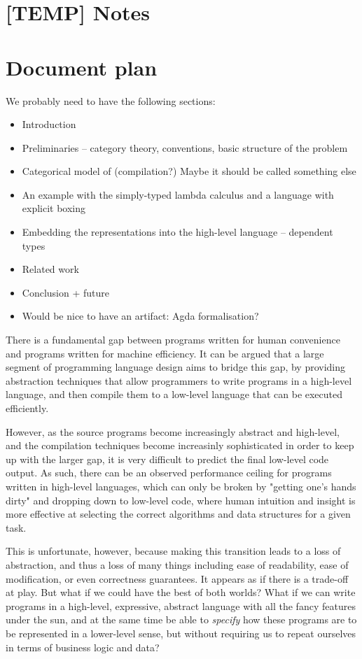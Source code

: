 \section{[TEMP] Notes}\label{sec:notes}

\section{Document plan}

We probably need to have the following sections:

\begin{itemize}
  \item Introduction
  \item Preliminaries -- category theory, conventions, basic structure of the problem
  \item Categorical model of (compilation?) Maybe it should be called something else
  \item An example with the simply-typed lambda calculus and a language with explicit
        boxing
  \item Embedding the representations into the high-level language -- dependent types
  \item Related work
  \item Conclusion + future
  \item Would be nice to have an artifact: Agda formalisation?
\end{itemize}

There is a fundamental gap between programs written for human convenience and
programs written for machine efficiency. It can be argued that a large segment
of programming language design aims to bridge this gap, by providing
abstraction techniques that allow programmers to write programs in a high-level
language, and then compile them to a low-level language that can be executed
efficiently.

However, as the source programs become increasingly abstract and high-level,
and the compilation techniques become increasinly sophisticated in order to
keep up with the larger gap, it is very difficult to predict the final
low-level code output. As such, there can be an observed performance ceiling
for programs written in high-level languages, which can only be broken by
"getting one's hands dirty" and dropping down to low-level code, where human
intuition and insight is more effective at selecting the correct algorithms and
data structures for a given task.

This is unfortunate, however, because making this transition leads to a loss of
abstraction, and thus a loss of many things including ease of readability, ease
of modification, or even correctness guarantees. It appears as if there is a
trade-off at play. But what if we could have the best of both worlds? What if
we can write programs in a high-level, expressive, abstract language with all
the fancy features under the sun, and at the same time be able to
\emph{specify} how these programs are to be represented in a lower-level sense,
but without requiring us to repeat ourselves in terms of business logic and
data?

